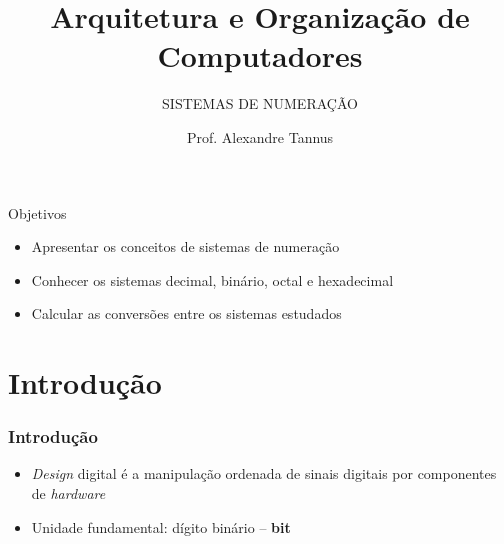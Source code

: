 \documentclass[aspectratio=169,
				xcolor=table]{beamer}
\institute[]{\uppercase{Engenharia de Software}}
\title[]{Arquitetura e Organização de Computadores}
\subtitle[]{\uppercase{Sistemas de Numeração}}
\author[]{Prof. Alexandre Tannus}
\date{}
\begin{document}
	\begin{frame}
		\titlepage
	\end{frame}

	\begin{frame}
		\tableofcontents		
	\end{frame}	

	\begin{frame}{Objetivos}
		\begin{itemize}
			\item Apresentar os conceitos de sistemas de numeração
			\vspace{1em}
			\item Conhecer os sistemas decimal, binário, octal e hexadecimal
			\vspace{1em}
			\item Calcular as conversões entre os sistemas estudados
		\end{itemize}
	\end{frame}

	\section{Introdução}
		\begin{frame}
			\frametitle{Introdução}
			\begin{itemize}
				\item \textit{Design} digital é a manipulação ordenada de sinais digitais por componentes de \textit{hardware}
				\item \alert{Unidade fundamental}: dígito binário – \textbf{bit}
			\end{itemize}			
		\end{frame}
\end{document}
